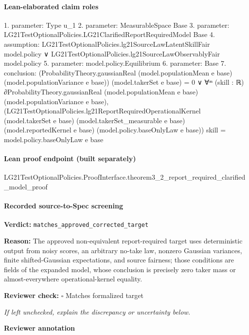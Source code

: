 \documentclass[10pt]{article}
\newcommand{\reviewerbox}{%
  \par\noindent\fbox{\parbox{0.96\linewidth}{\rule{0pt}{0.38in}}}\par
}
\newcommand{\reviewmatch}[1]{%
  \par\noindent\textbf{Reviewer check:} $\square$\; #1\par
  \noindent\emph{If left unchecked, explain the discrepancy or uncertainty below.}\par
}
\begin{document}
\paragraph{Lean-elaborated claim roles}\begin{ReviewVerbatim}
1. parameter: Type u_1
2. parameter: MeasurableSpace Base
3. parameter: LG21TestOptionalPolicies.LG21ClarifiedReportRequiredModel Base
4. assumption: LG21TestOptionalPolicies.lg21SourceLawLatentSkillFair model.policy ∨
  LG21TestOptionalPolicies.lg21SourceLawObservablyFair model.policy
5. parameter: model.policy.Equilibrium
6. parameter: Base
7. conclusion: (ProbabilityTheory.gaussianReal (model.populationMean e base) (model.populationVariance e base))
      (model.takerSet e base) =
    0 ∨
  ∀ᵐ (skill : ℝ) ∂ProbabilityTheory.gaussianReal (model.populationMean e base) (model.populationVariance e base),
    (LG21TestOptionalPolicies.lg21ReportRequiredOperationalKernel (model.takerSet e base)
          (model.takerSet_measurable e base) (model.reportedKernel e base) (model.policy.baseOnlyLaw e base))
        skill =
      model.policy.baseOnlyLaw e base
\end{ReviewVerbatim}

\paragraph{Lean proof endpoint (built separately)}\begin{ReviewVerbatim}
LG21TestOptionalPolicies.ProofInterface.theorem3_2_report_required_clarified_model_proof
\end{ReviewVerbatim}

\paragraph{Recorded source-to-Spec screening}
\textbf{Verdict:} \texttt{matches\_approved\_corrected\_target}
\\
{\raggedright
\textbf{Reason:} The approved non-\allowbreak{}equivalent report-\allowbreak{}required target uses deterministic output from noisy scores, an arbitrary no-\allowbreak{}take law, nonzero Gaussian variances, finite shifted-\allowbreak{}Gaussian expectations, and source fairness;\allowbreak{} those conditions are fields of the expanded model, whose conclusion is precisely zero taker mass or almost-\allowbreak{}everywhere operational-\allowbreak{}kernel equality.\allowbreak{}
\par}
\reviewmatch{Matches formalized target}
\noindent\textbf{Reviewer annotation}\par
\reviewerbox
\clearpage
\hypertarget{source-claim-df450adcc2f093c2}{}
\end{document}
